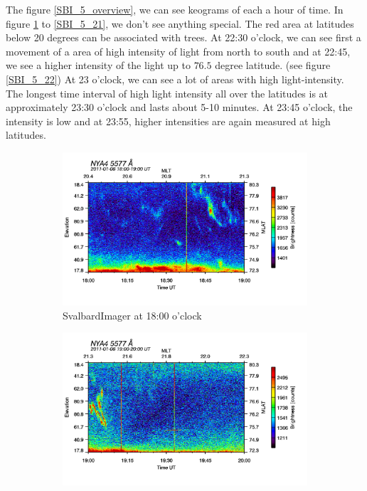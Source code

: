 \documentclass[10pt,a4paper]{article}
\begin{document}
The figure \ref{SBI_5_overview}, we can see keograms of each a hour of time. In figure \ref{SBI_5_18} to \ref{SBI_5_21}, we don't see anything special. The red area at latitudes below 20 degrees can be associated with trees. At 22:30 o'clock, we can see first a movement of a area of high intensity of light from north to south and at 22:45, we see a higher intensity of the light up to $76.5$ degree latitude. (see figure \ref{SBI_5_22})
At 23 o'clock, we can see a lot of areas with high light-intensity. The longest time interval of high light intensity all over the latitudes is at approximately 23:30 o'clock and lasts about 5-10 minutes. At 23:45 o'clock, the intensity is low and at 23:55, higher intensities are again measured at high latitudes. 
\begin{figure}[h]
\centering
\begin{subfigure}{0.3\textwidth}
\centering
	\includegraphics[width=\textwidth]{SvalbardImager5577A18.png}
	\caption{ SvalbardImager at 18:00 o'clock \label{SBI_5_18}}
\end{subfigure}
\begin{subfigure}{0.3\textwidth}
\centering
	\includegraphics[width=\textwidth]{SvalbardImager5577A19.png}

\end{subfigure}
\end{figure}
\end{document}
